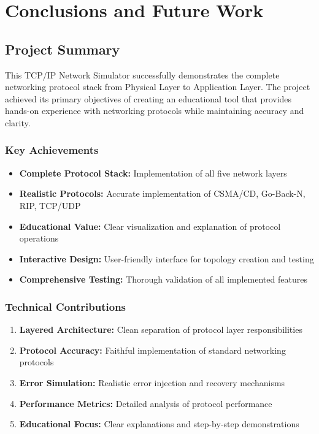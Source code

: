 \documentclass[12pt,a4paper]{article}
\begin{document}
\newpage

\section{Conclusions and Future Work}

\subsection{Project Summary}

This TCP/IP Network Simulator successfully demonstrates the complete networking protocol stack from Physical Layer to Application Layer. The project achieved its primary objectives of creating an educational tool that provides hands-on experience with networking protocols while maintaining accuracy and clarity.

\subsubsection{Key Achievements}

\begin{itemize}
\item \textbf{Complete Protocol Stack:} Implementation of all five network layers
\item \textbf{Realistic Protocols:} Accurate implementation of CSMA/CD, Go-Back-N, RIP, TCP/UDP
\item \textbf{Educational Value:} Clear visualization and explanation of protocol operations
\item \textbf{Interactive Design:} User-friendly interface for topology creation and testing
\item \textbf{Comprehensive Testing:} Thorough validation of all implemented features
\end{itemize}

\subsubsection{Technical Contributions}

\begin{enumerate}
\item \textbf{Layered Architecture:} Clean separation of protocol layer responsibilities
\item \textbf{Protocol Accuracy:} Faithful implementation of standard networking protocols
\item \textbf{Error Simulation:} Realistic error injection and recovery mechanisms
\item \textbf{Performance Metrics:} Detailed analysis of protocol performance
\item \textbf{Educational Focus:} Clear explanations and step-by-step demonstrations
\end{enumerate}
\end{document}
